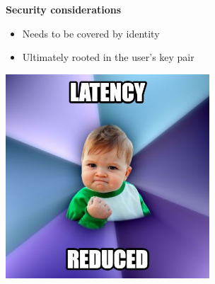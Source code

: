 \documentclass[helvetica]{seminar}
\newcommand{\heading}[1]{%
  \begin{center} 
    \large\bf 
    #1 
  \end{center} 
  \vspace{.4 in}}
\begin{document}
\begin{slide}
\heading{Security considerations}

\begin{itemize}
\item Needs to be covered by identity
\item Ultimately rooted in the user's key pair
\end{itemize}

\end{slide}

\begin{slide}
\begin{center}
\includegraphics[width=3in]{850923}
\end{center}
\end{slide}
\end{document}
